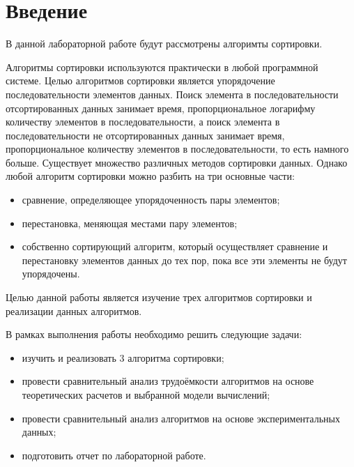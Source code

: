 \chapter*{Введение}

В данной лабораторной работе будут рассмотрены алгоримты сортировки.

Алгоритмы сортировки используются практически в любой программной системе. Целью алгоритмов сортировки является упорядочение последовательности элементов данных. Поиск элемента в последовательности отсортированных данных занимает время, пропорциональное логарифму количеству элементов в последовательности, а поиск элемента в последовательности не отсортированных данных занимает время, пропорциональное количеству элементов в последовательности, то есть намного больше. Существует множество различных методов сортировки данных. Однако любой алгоритм сортировки можно разбить на три основные части:
\begin{itemize}
    \item сравнение, определяющее упорядоченность пары элементов;
    \item перестановка, меняющая местами пару элементов;
    \item собственно сортирующий алгоритм, который осуществляет сравнение и перестановку элементов данных до тех пор, пока все эти элементы не будут упорядочены.
\end{itemize}

Целью данной работы является изучение трех алгоритмов сортировки и реализации данных алгоритмов.

В рамках выполнения работы необходимо решить следующие задачи:
\begin{itemize}
	\item изучить и реализовать 3 алгоритма сортировки;
	\item провести сравнительный анализ трудоёмкости алгоритмов на основе теоретических расчетов и выбранной модели вычислений;
	\item провести сравнительный анализ алгоритмов на основе экспериментальных данных;
    \item подготовить отчет по лабораторной работе.
\end{itemize}
